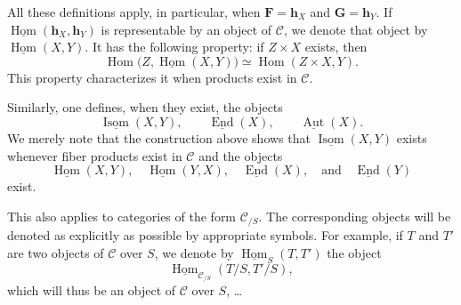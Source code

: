 All these definitions apply, in particular, when
\(\mathbf F=\mathbf h_X\) and \(\mathbf G=\mathbf h_Y\). If
\(\underline{\operatorname{Hom}}(\mathbf h_X,\mathbf h_Y)\) is
representable by an object of \(\mathscr C\), we denote that object by
\(\underline{\operatorname{Hom}}(X,Y)\). It has the following property:
if \(Z\times X\) exists, then
\[
  \operatorname{Hom}
    \bigl(Z,\underline{\operatorname{Hom}}(X,Y)\bigr)
    \simeq
  \operatorname{Hom}(Z\times X,Y).
\]
This property characterizes it when products exist in \(\mathscr C\).

Similarly, one defines, when they exist, the objects
\[
  \underline{\operatorname{Isom}}(X,Y),
  \qquad
  \underline{\operatorname{End}}(X),
  \qquad
  \underline{\operatorname{Aut}}(X).
\]
We merely note that the construction above shows that
\(\underline{\operatorname{Isom}}(X,Y)\) exists whenever fiber products
exist in \(\mathscr C\) and the objects
\[
  \underline{\operatorname{Hom}}(X,Y),
  \quad
  \underline{\operatorname{Hom}}(Y,X),
  \quad
  \underline{\operatorname{End}}(X),
  \quad\text{and}\quad
  \underline{\operatorname{End}}(Y)
\]
exist.

This also applies to categories of the form \(\mathscr C_{/S}\).
The corresponding objects will be denoted as explicitly as possible by
appropriate symbols. For example, if \(T\) and \(T'\) are two objects of
\(\mathscr C\) over \(S\), we denote by
\(\underline{\operatorname{Hom}}_S(T,T')\) the object
\[
  \underline{\operatorname{Hom}}_{\mathscr C_{/S}}(T/S,T'/S),
\]
which will thus be an object of \(\mathscr C\) over \(S\), \ldots

